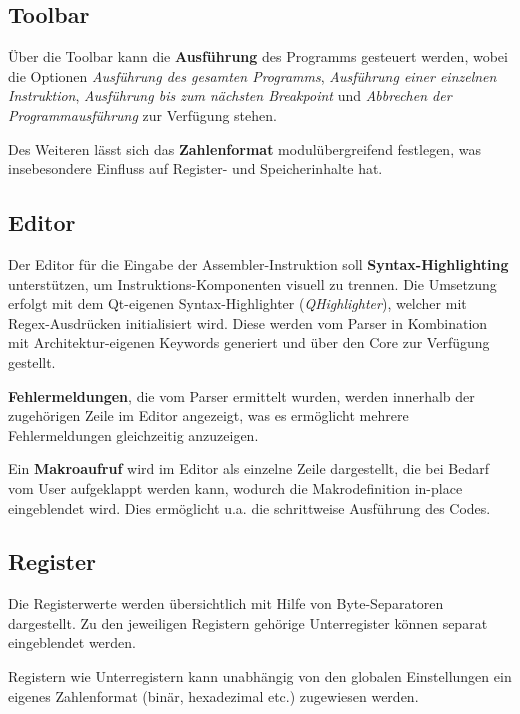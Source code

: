 \documentclass{article}
\begin{document}
        \subsection{Toolbar}
        
            Über die Toolbar kann die \textbf{Ausführung} des Programms gesteuert werden, wobei die Optionen \textit{Ausführung des gesamten Programms}, \textit{Ausführung einer einzelnen Instruktion}, \textit{Ausführung bis zum nächsten Breakpoint} und \textit{Abbrechen der Programmausführung} zur Verfügung stehen.
            
            Des Weiteren lässt sich das \textbf{Zahlenformat} modulübergreifend festlegen, was insebesondere Einfluss auf Register- und Speicherinhalte hat.
    
        \subsection{Editor}
        
            Der Editor für die Eingabe der Assembler-Instruktion soll \textbf{Syntax-Highlighting} unterstützen, um Instruktions-Komponenten visuell zu trennen. Die Umsetzung erfolgt mit dem Qt-eigenen Syntax-Highlighter (\textit{QHighlighter}), welcher mit Regex-Ausdrücken initialisiert wird. Diese werden vom Parser in Kombination mit Architektur-eigenen Keywords generiert und über den Core zur Verfügung gestellt.
    
            \textbf{Fehlermeldungen}, die vom Parser ermittelt wurden, werden innerhalb der zugehörigen Zeile im Editor angezeigt, was es ermöglicht mehrere Fehlermeldungen gleichzeitig anzuzeigen.
            
            Ein \textbf{Makroaufruf} wird im Editor als einzelne Zeile dargestellt, die bei Bedarf vom User aufgeklappt werden kann, wodurch die Makrodefinition in-place eingeblendet wird. Dies ermöglicht u.a. die schrittweise Ausführung des Codes.
            
        \subsection{Register}
        
            Die Registerwerte werden übersichtlich mit Hilfe von Byte-Separatoren dargestellt. Zu den jeweiligen Registern gehörige Unterregister können separat eingeblendet werden.
            
            Registern wie Unterregistern kann unabhängig von den globalen Einstellungen ein eigenes Zahlenformat (binär, hexadezimal etc.) zugewiesen werden.
            
\end{document}
